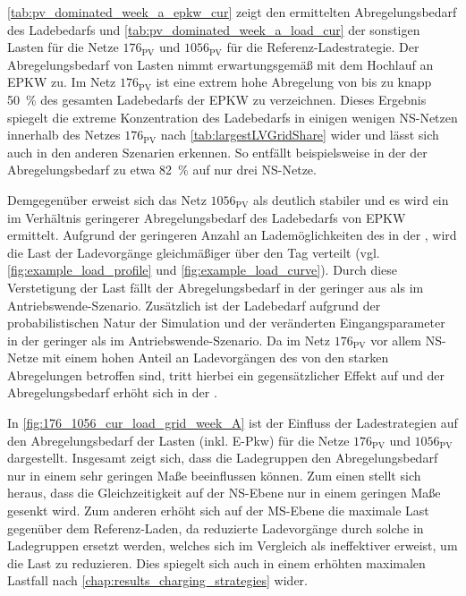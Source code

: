 



\autoref{tab:pv_dominated_week_a_epkw_cur} zeigt den ermittelten Abregelungsbedarf des Ladebedarfs und \autoref{tab:pv_dominated_week_a_load_cur} der sonstigen Lasten für die Netze \(176_{\text{PV}}\) und \(1056_{\text{PV}}\) für die Referenz-Ladestrategie.
Der Abregelungsbedarf von Lasten nimmt erwartungsgemäß mit dem Hochlauf an \gls{EPKW} zu.
Im Netz \(176_{\text{PV}}\) ist eine extrem hohe Abregelung von bis zu knapp \SI{50}{\percent} des gesamten Ladebedarfs der \gls{EPKW} zu verzeichnen.
Dieses Ergebnis spiegelt die extreme Konzentration des Ladebedarfs in einigen wenigen \gls{NS}-Netzen innerhalb des Netzes \(176_{\text{PV}}\) nach \autoref{tab:largestLVGridShare} wider und lässt sich auch in den anderen Szenarien erkennen.
So entfällt beispielsweise in der \SzeFirmenparkplatz der Abregelungsbedarf zu etwa \SI{82}{\percent} auf nur drei \gls{NS}-Netze.





Demgegenüber erweist sich das Netz \(1056_{\text{PV}}\) als deutlich stabiler und es wird ein im Verhältnis geringerer Abregelungsbedarf des Ladebedarfs von \gls{EPKW} ermittelt.
Aufgrund der geringeren Anzahl an Lademöglichkeiten des \UC \Firmeparkplatz in der \SzeFirmenparkplatzdot, wird die Last der Ladevorgänge gleichmäßiger über den Tag verteilt (vgl. \autoref{fig:example_load_profile} und \autoref{fig:example_load_curve}).
Durch diese Verstetigung der Last fällt der Abregelungsbedarf in der \SzeFirmenparkplatz geringer aus als im Antriebswende-Szenario.
Zusätzlich ist der Ladebedarf aufgrund der probabilistischen Natur der Simulation und der veränderten Eingangsparameter in der \SzeFirmenparkplatz geringer als im Antriebswende-Szenario.
Da im Netz \(176_{\text{PV}}\) vor allem \gls{NS}-Netze mit einem hohen Anteil an Ladevorgängen des \UC \zH von den starken Abregelungen betroffen sind, tritt hierbei ein gegensätzlicher Effekt auf und der Abregelungsbedarf erhöht sich in der \SzeFirmenparkplatzdot.



\clearpage

In \autoref{fig:176_1056_cur_load_grid_week_A} ist der Einfluss der Ladestrategien auf den Abregelungsbedarf der Lasten (inkl. E-Pkw) für die Netze \(176_{\text{PV}}\) und \(1056_{\text{PV}}\) dargestellt.
Insgesamt zeigt sich, dass die Ladegruppen den Abregelungsbedarf nur in einem sehr geringen Maße beeinflussen können.
Zum einen stellt sich heraus, dass die Gleichzeitigkeit auf der \gls{NS}-Ebene nur in einem geringen Maße gesenkt wird.
Zum anderen erhöht sich auf der \gls{MS}-Ebene die maximale Last gegenüber dem Referenz-Laden, da reduzierte Ladevorgänge durch solche in Ladegruppen ersetzt werden, welches sich im Vergleich als ineffektiver erweist, um die Last zu reduzieren.
Dies spiegelt sich auch in einem erhöhten maximalen Lastfall nach \autoref{chap:results_charging_strategies} wider.

